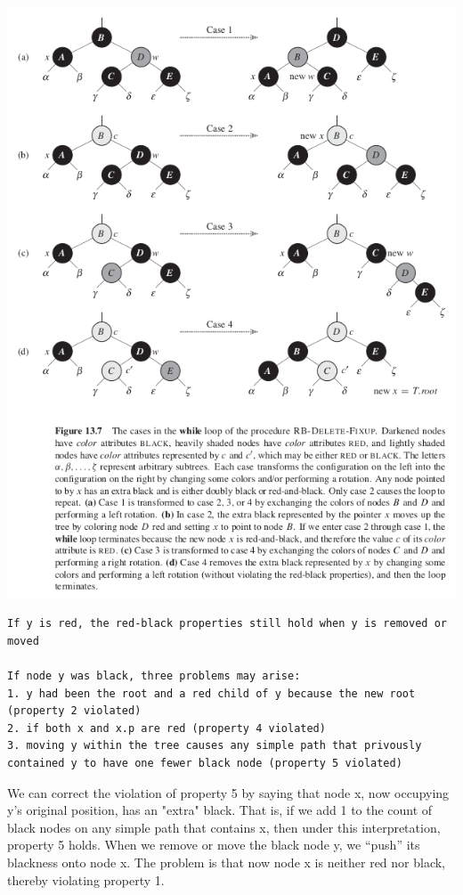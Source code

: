 \documentclass[11pt]{article}
\begin{document}
\includegraphics[width=.9\linewidth]{pics/c13_rb_delete_fixup_fig.png} \\

\begin{verbatim}
If y is red, the red-black properties still hold when y is removed or moved

If node y was black, three problems may arise:
1. y had been the root and a red child of y because the new root (property 2 violated)
2. if both x and x.p are red (property 4 violated)
3. moving y within the tree causes any simple path that privously contained y to have one fewer black node (property 5 violated)
\end{verbatim}

We can correct the violation of property 5 by saying that node x, now occupying y’s original position, has an "extra" black. That is, if we add 1 to the count of black nodes on any simple path that contains x, then under this interpretation, property 5 holds. When we remove or move the black node y, we “push” its blackness onto node x. The problem is that now node x is neither red nor black, thereby violating property 1. \\
\end{document}
